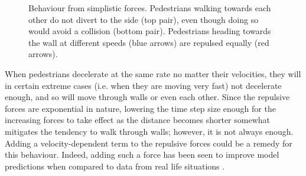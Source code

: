 \begin{figure}[h]
    \centering
    \caption[Behaviour from simplistic forces]{Behaviour from simplistic 
    forces.  Pedestrians walking towards each other 
    do not divert to the side (top pair), even though doing so would avoid a 
    collision (bottom pair).  Pedestrians 
    heading towards the wall at different speeds (blue arrows) are repulsed 
    equally (red arrows).}
    \label{fig:extra-forces-behaviour}
\end{figure}

When pedestrians decelerate at the same rate no matter their velocities, they 
will in certain extreme cases (i.e. when they are moving very fast) not 
decelerate enough, and so will move through walls or even each other. Since 
the repulsive forces are exponential in nature, lowering the time step size 
enough for the increasing forces to take effect as the distance becomes 
shorter somewhat mitigates the tendency to walk through walls; however, it is 
not always enough. Adding a velocity-dependent term to the repulsive forces 
could be a remedy for this behaviour. Indeed, adding such a force has been 
seen to improve model predictions when compared to data from real life 
situations \cite{ABconstant}.

